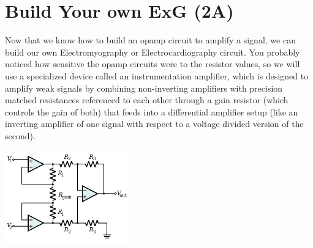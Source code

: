 \chapter{Build Your own ExG (2A)}

Now that we know how to build an opamp circuit to amplify a signal, we can build our own Electromyography or Electrocardiography circuit.  You probably noticed how sensitive the opamp circuits were to the resistor values, so we will use a specialized device called an instrumentation amplifier, which is designed to amplify weak signals by combining non-inverting amplifiers with precision matched resistances referenced to each other through a gain resistor (which controls the gain of both) that feeds into a differential amplifier setup (like an inverting amplifier of one signal with respect to a voltage divided version of the second).

\includegraphics[width=0.4\textwidth]{../images/400px-Op-Amp_Instrumentation_Amplifier.png}

